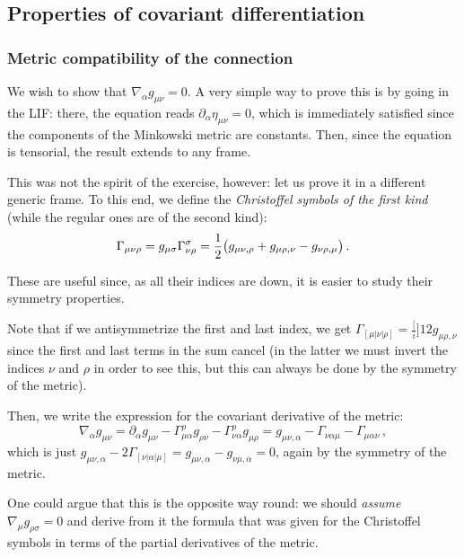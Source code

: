 \documentclass[main.tex]{subfiles}
\begin{document}
\subsection{Properties of covariant differentiation}

\subsubsection{Metric compatibility of the connection}

We wish to show that \(\nabla_{\alpha } g_{\mu \nu } = 0\).
A very simple way to prove this is by going in the LIF: there, the equation reads \(\partial_{\alpha }\eta_{\mu \nu } = 0\), which is immediately satisfied since the components of the Minkowski metric are constants.
Then, since the equation is tensorial, the result extends to any frame.

This was not the spirit of the exercise, however: let us prove it in a different generic frame.
To this end, we define the \emph{Christoffel symbols of the first kind} (while the regular ones are of the second kind): 
%
\begin{equation}
  \Gamma_{\mu \nu \rho } = g_{\mu \sigma }\Gamma^{\sigma }_{\nu \rho } = \frac{1}{2} \qty(g_{\mu \nu, \rho } + g_{\mu \rho , \nu } - g_{\nu \rho, \mu })
\,.
\end{equation}

These are useful since, as all their indices are down, it is easier to study their symmetry properties.

Note that if we antisymmetrize the first and last index, we get \(\Gamma_{[\mu | \nu | \rho]} = \frac[i]{1}{2} g_{\mu \rho, \nu }\) since the first and last terms in the sum cancel (in the latter we must invert the indices \(\nu \) and \(\rho \) in order to see this, but this can always be done by the symmetry of the metric).

Then, we write the expression for the covariant derivative of the metric: 
%
\begin{equation}
  \nabla_{\alpha }g_{\mu \nu }= \partial_\alpha g_{\mu \nu }
  - \Gamma^{\rho }_{\mu \alpha }g_{\rho \nu } 
  - \Gamma^{\rho }_{\nu \alpha  }g_{\mu \rho  } 
  = g_{\mu \nu , \alpha } 
  - \Gamma_{\nu \alpha \mu }
  - \Gamma_{\mu \alpha \nu }
\,,
\end{equation}
%
which is just \(g_{\mu \nu , \alpha } - 2 \Gamma_{[\nu | \alpha | \mu ]} = g_{\mu \nu , \alpha } - g_{\nu \mu , \alpha } = 0\), again by the symmetry of the metric.

One could argue that this is the opposite way round: we should \emph{assume} \(\nabla_{\mu } g_{\rho \sigma } = 0   \) and derive from it the formula that was given for the Christoffel symbols in terms of the partial derivatives of the metric.
\end{document}
